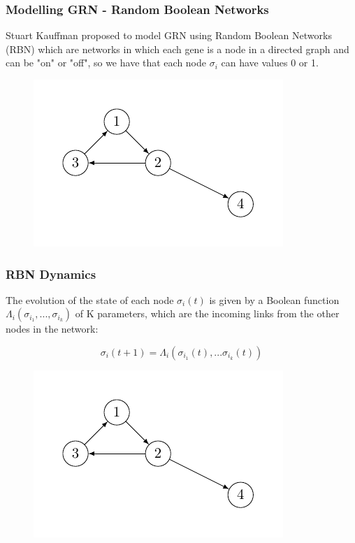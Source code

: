 \documentclass{beamer}
\begin{document}
\begin{frame}
\frametitle{Modelling GRN - Random Boolean Networks}
Stuart Kauffman proposed to model GRN using Random Boolean Networks (RBN)
which are networks in which each gene is a node in a directed graph and can be "on" or "off", so we have that each node $\sigma_i$ can have values 0 or 1.

\begin{figure}
\centering
\includegraphics{figurenetworks2.pdf}
\end{figure}
\end{frame}



\begin{frame}
\frametitle{RBN Dynamics}
The evolution of the state of each node $\sigma_i(t)$ is given by a Boolean function $\Lambda_i(\sigma_{i_1},...,\sigma_{i_k})$ of K parameters, which are the incoming links from the other nodes in the network:


$$
\sigma_i(t+1) = \Lambda_i(\sigma_{i_1}(t),...\sigma_{i_k}(t))
$$
\begin{figure}
\centering
\includegraphics{figurenetworks2.pdf}
\end{figure}
\end{frame}
\end{document}
